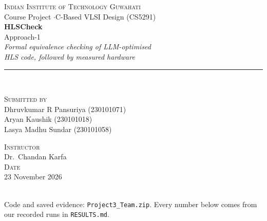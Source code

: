 \documentclass[10pt,a4paper]{article}
\begin{document}
\thispagestyle{empty}
\vspace*{\fill}
\begin{center}
{\large\scshape\color{ink} Indian Institute of Technology Guwahati}\\[2pt]
{\small\color{black!70} Course Project \quad$\cdot$\quad C-Based VLSI Design (CS5291)}\\[24pt]
{\fontsize{30}{36}\selectfont\bfseries\color{ink} HLSCheck}\\[4pt]
{\large\color{black!70} Approach-1}\\[8pt]
{\Large\itshape\color{acc} Formal equivalence checking of LLM-optimised\\[2pt] HLS code, followed by measured hardware}\\[12pt]
{\color{ink}\rule{0.8\linewidth}{0.6pt}}\\[16pt]
\begin{minipage}[t]{0.48\linewidth}\centering
{\small\scshape\color{acc} Submitted by}\\[4pt]
Dhruvkumar R Pansuriya (230101071)\\
Aryan Kaushik (230101018)\\
Lasya Madhu Sundar (230101058)
\end{minipage}\hfill
\begin{minipage}[t]{0.48\linewidth}\centering
{\small\scshape\color{acc} Instructor}\\[4pt]
Dr.\ Chandan Karfa\\[10pt]
{\small\scshape\color{acc} Date}\\[4pt]
23 November 2026
\end{minipage}\\[16pt]
{\small\color{black!70} Code and saved evidence: \texttt{Project3\_Team.zip}. Every number below comes from our
recorded runs in \texttt{RESULTS.md}.}
\end{center}
\vspace{6pt}
\begin{abstract}
\noindent HLSCheck, our first approach, asks a language model to rewrite a small C kernel so that the hardware made from it is
better, and then answers two separate questions. First, does the rewrite compute exactly the same
thing as the original? Second, if it does, is the hardware actually better? The first question is
answered by a C-to-C equivalence checker that combines our own symbolic executor with the
ESBMC model checker and the Z3 solver. The second is answered by running both versions through the
Bambu HLS tool, simulating the RTL with Verilator, and measuring area with Yosys and timing with
OpenSTA. On our main set of 50 rewrites, all 50 were proved equivalent and all 50 planted faults
were caught; yet only 22 rewrites improved area times latency, 25 made it worse and 3 left it
unchanged. In an 80-case suite of subtle faults, every label matched, and five faults that slipped
past 264 test inputs were still caught by the proof. This report explains how the method works,
which tools it uses, one complete example, and what was measured.
\end{abstract}
\vspace*{\fill}
\newpage
\end{document}
